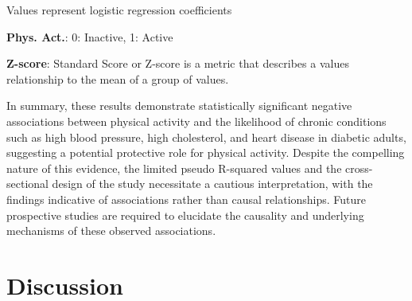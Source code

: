 \documentclass[11pt]{article}
\begin{document}
\begin{table}[h]
\caption{\protect\hyperlink{file-table-3-pkl}{Association between physical activity and heart disease among diabetics}}
\label{table:association_coronary}
\begin{threeparttable}
\renewcommand{\TPTminimum}{\linewidth}
\begin{tablenotes}
\footnotesize
\item Values represent logistic regression coefficients
\item \textbf{Phys. Act.}: 0: Inactive, 1: Active
\item \textbf{Z-score}: Standard Score or Z-score is a metric that describes a values relationship to the mean of a group of values.
\end{tablenotes}
\end{threeparttable}
\end{table}


In summary, these results demonstrate statistically significant negative associations between physical activity and the likelihood of chronic conditions such as high blood pressure, high cholesterol, and heart disease in diabetic adults, suggesting a potential protective role for physical activity. Despite the compelling nature of this evidence, the limited pseudo R-squared values and the cross-sectional design of the study necessitate a cautious interpretation, with the findings indicative of associations rather than causal relationships. Future prospective studies are required to elucidate the causality and underlying mechanisms of these observed associations.

\section*{Discussion}
\end{document}
